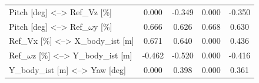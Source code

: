 \begin{tabularx}{\textwidth}{|X | cc | cc |}
        Pitch [deg] <--> Ref\_Vz [\%] & 0.000 & -0.349 & 0.000 & -0.350 \\
        Pitch [deg] <--> Ref\_$\omega$y [\%] & 0.666 & 0.626 & 0.668 & 0.630 \\
        Ref\_Vx [\%] <--> X\_body\_ist [m] & 0.671 & 0.640 & 0.000 & 0.436 \\
        Ref\_$\omega$z [\%] <--> Y\_body\_ist [m] & -0.462 & -0.520 & 0.000 & -0.416 \\
        Y\_body\_ist [m] <--> Yaw [deg] & 0.000 & 0.398 & 0.000 & 0.361 \\
    \end{tabularx}
\endgroup




